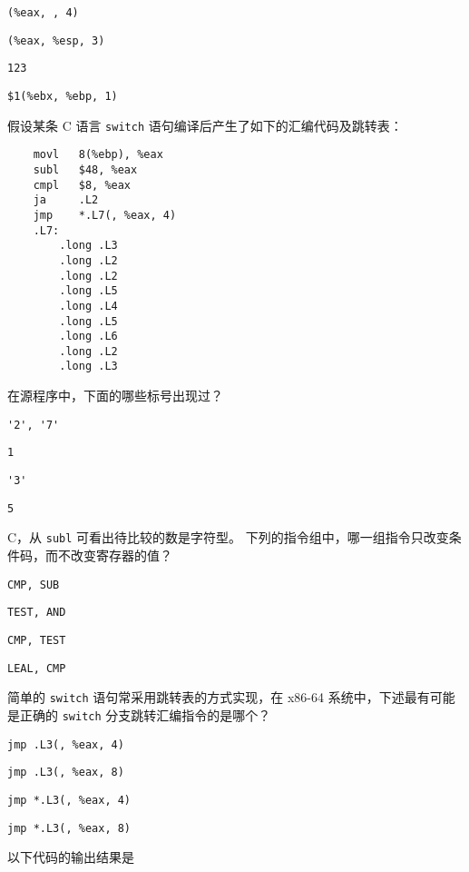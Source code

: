 \begin{problems}
\begin{choices}
            \item \verb|(%eax, , 4)|
            \item \verb|(%eax, %esp, 3)|
            \item \verb|123|
            \item \verb|$1(%ebx, %ebp, 1)|
        \end{choices}
         假设某条 C 语言 \verb|switch| 语句编译后产生了如下的汇编代码及跳转表：
        \begin{verbatim}
    movl   8(%ebp), %eax
    subl   $48, %eax
    cmpl   $8, %eax
    ja     .L2
    jmp    *.L7(, %eax, 4)
    .L7:
        .long .L3
        .long .L2
        .long .L2
        .long .L5
        .long .L4
        .long .L5
        .long .L6
        .long .L2
        .long .L3
        \end{verbatim}
        在源程序中，下面的哪些标号出现过？
        \begin{choices}
            \item \verb|'2', '7'|
            \item \verb|1|
            \item \verb|'3'|
            \item \verb|5|
        \end{choices}
        \sol C，从 \verb|subl| 可看出待比较的数是字符型。
         下列的指令组中，哪一组指令只改变条件码，而不改变寄存器的值？
        \begin{choices}
            \item \verb|CMP, SUB|
            \item \verb|TEST, AND|
            \item \verb|CMP, TEST|
            \item \verb|LEAL, CMP|
        \end{choices}
         简单的 \verb|switch| 语句常采用跳转表的方式实现，在 x86-64 系统中，下述最有可能是正确的 \verb|switch| 分支跳转汇编指令的是哪个？
        \begin{choices}
            \item \verb|jmp .L3(, %eax, 4)|
            \item \verb|jmp .L3(, %eax, 8)|
            \item \verb|jmp *.L3(, %eax, 4)|
            \item \verb|jmp *.L3(, %eax, 8)|
        \end{choices}
         以下代码的输出结果是
        \begin{verbatim}

\end{verbatim}
\end{problems}
